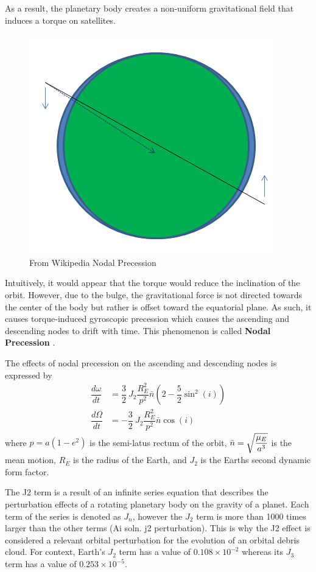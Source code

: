 \documentclass[a4paper, 12pt]{article}
\newcommand{\boldindex}[1]{%
	\textbf{#1}\index{#1}%
}
\begin{document}
As a result, the planetary body creates a non-uniform gravitational field that induces a torque on satellites. 

\begin{figure}[h]
	\centering
	\includegraphics[scale=0.4]{Nodal_precession}
	\caption{From Wikipedia Nodal Precession}
\end{figure}

Intuitively, it would appear that the torque would reduce the inclination of the orbit. However, due to the bulge, the gravitational force is not directed towards the center of the body but rather is offset toward the equatorial plane. As such, it causes torque-induced gyroscopic precession which causes the ascending and descending nodes to drift with time. This phenomenon is called \boldindex{Nodal Precession}.

The effects of nodal precession on the ascending and descending nodes is expressed by
\begin{align*}
	\dfrac{d\omega}{dt} &= \dfrac{3}{2}\:J_2\dfrac{R_E^2}{p^2}\bar{n}(2 - \dfrac{5}{2}\sin^2(i))\\
	\dfrac{d\Omega}{dt} &= -\dfrac{3}{2}\:J_2\dfrac{R_E^2}{p^2}\bar{n}\cos(i)
\end{align*}
where $p = a(1 - e^2)$ is the semi-latus rectum of the orbit, $\bar{n}=\sqrt{\mathstrut\dfrac{\mu_E}{a^3}}$ is the mean motion, $R_E$ is the radius of the Earth, and $J_2$ is the Earths second dynamic form factor.

The J2 term is a result of an infinite series equation that describes the perturbation effects of a rotating planetary body on the gravity of a planet. Each term of the series is denoted as $J_n$, however the $J_2$ term is more than 1000 times larger than the other terms (Ai soln. j2 perturbation). This is why the J2 effect is considered a relevant orbital perturbation for the evolution of an orbital debris cloud. For context, Earth's  $J_2$ term has a value of $0.108 \times 10^{-2}$ whereas its $J_3$ term has a value of $0.253 \times 10^{-5}$.
\end{document}
